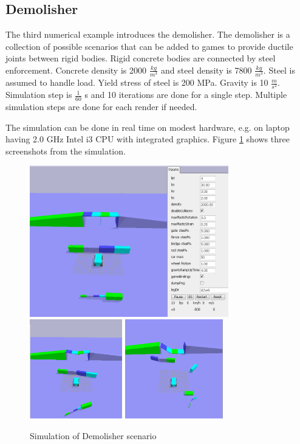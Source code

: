 \subsection{Demolisher}
The third numerical example introduces the demolisher.
The demolisher is a collection of possible scenarios that can be added to games to provide ductile joints between
rigid bodies.  Rigid concrete bodies are connected by steel enforcement.
Concrete density is 2000 $\frac{kg}{m^3}$ and steel density is 7800 $\frac{kg}{m^3}$. 
Steel is assumed to handle load. Yield stress of steel is 200 MPa.
Gravity is 10  $\frac{m}{s^2}$. Simulation step is $\frac{1}{60} $ s and 10 
iterations are done for a single step. Multiple simulation steps are done for each render if needed.

The simulation can be done in real time on modest hardware, e.g. 
on laptop having 2.0 GHz Intel i3 CPU with integrated graphics. 
Figure \ref{fig:demolisher} shows three screenshots from the simulation.

\begin{figure}
\centering
\includegraphics[width=8.65cm]{figs/demolisher-pre}
\includegraphics[height=4.3cm]{figs/demolisher-wip}
\includegraphics[height=4.3cm]{figs/demolisher-done}
\caption{Simulation of Demolisher scenario}
\label{fig:demolisher}
\end{figure}

